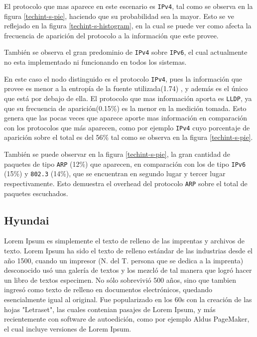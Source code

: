 \documentclass[final,inline,a4paper,narroweqnarray]{ieee}
\begin{document}
    El protocolo que mas aparece en este escenario es \texttt{IPv4}, tal
    como se observa en la figura \ref{techint-s-pie}, haciendo que 
    su probabilidad sea la
    mayor. Esto se ve reflejado en la figura \ref{techint-s-histogram},
    en la cual se puede ver como
    afecta la frecuencia de aparición del protocolo a la información
    que este provee.

    También se observa el gran predominio de \texttt{IPv4} sobre \texttt{IPv6},
    el cual actualmente no esta implementado ni funcionando en todos
    los sistemas.

    En este caso el nodo distinguido es el protocolo \texttt{IPv4}, 
    pues la información que provee es menor a la entropía de la fuente 
    utilizada(1.74) , y además es el único que está por debajo de ella. El
    protocolo que mas información aporta es \texttt{LLDP}, ya que
    su frecuencia de aparición(0.15\%) es la menor en la medición tomada. Esto
    genera que las pocas veces que aparece aporte mas información en 
    comparación con los protocolos que más aparecen, como por ejemplo 
    \texttt{IPv4} cuyo porcentaje de aparición sobre el total es del 56\%
    tal como se observa en la figura \ref{techint-s-pie}.

    También se puede observar en la figura \ref{techint-s-pie}, la gran cantidad de paquetes 
    de tipo \texttt{ARP} (12\%) que aparecen, en comparación con los
    de tipo \texttt{IPv6} (15\%) y \texttt{802.3} (14\%), que se encuentran
    en segundo lugar y tercer lugar respectivamente. Esto demuestra el overhead
    del protocolo \texttt{ARP} sobre el total de paquetes escuchados.

  \subsection{Hyundai}

Lorem Ipsum es simplemente el texto de relleno de las imprentas y archivos de texto. Lorem Ipsum ha sido el texto de relleno estándar de las industrias desde el año 1500, cuando un impresor (N. del T. persona que se dedica a la imprenta) desconocido usó una galería de textos y los mezcló de tal manera que logró hacer un libro de textos especimen. No sólo sobrevivió 500 años, sino que tambien ingresó como texto de relleno en documentos electrónicos, quedando esencialmente igual al original. Fue popularizado en los 60s con la creación de las hojas "Letraset", las cuales contenian pasajes de Lorem Ipsum, y más recientemente con software de autoedición, como por ejemplo Aldus PageMaker, el cual incluye versiones de Lorem Ipsum.
\end{document}
